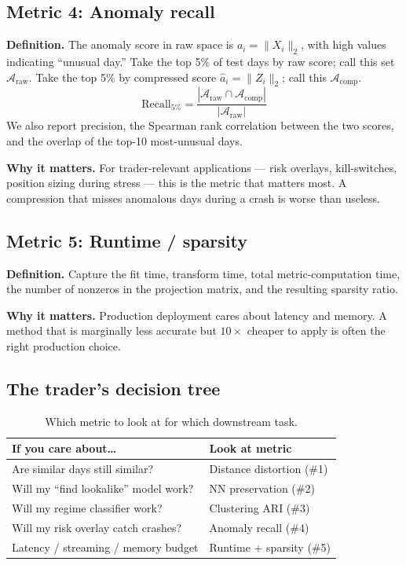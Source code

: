 \documentclass[11pt]{article}
\begin{document}
\subsection{Metric 4: Anomaly recall}

\textbf{Definition.} The anomaly score in raw space is $a_i = \|X_i\|_2$, with high values indicating ``unusual day.'' Take the top 5\% of test days by raw score; call this set $\mathcal{A}_{\mathrm{raw}}$. Take the top 5\% by compressed score $\hat a_i = \|Z_i\|_2$; call this $\mathcal{A}_{\mathrm{comp}}$.
\[
\mathrm{Recall}_{5\%} = \frac{|\mathcal{A}_{\mathrm{raw}} \cap \mathcal{A}_{\mathrm{comp}}|}{|\mathcal{A}_{\mathrm{raw}}|}
\]
We also report precision, the Spearman rank correlation between the two scores, and the overlap of the top-10 most-unusual days.

\textbf{Why it matters.} For trader-relevant applications --- risk overlays, kill-switches, position sizing during stress --- this is the metric that matters most. A compression that misses anomalous days during a crash is worse than useless.

\subsection{Metric 5: Runtime / sparsity}

\textbf{Definition.} Capture the fit time, transform time, total metric-computation time, the number of nonzeros in the projection matrix, and the resulting sparsity ratio.

\textbf{Why it matters.} Production deployment cares about latency and memory. A method that is marginally less accurate but $10\times$ cheaper to apply is often the right production choice.

\subsection{The trader's decision tree}

\begin{table}[H]
\centering
\caption{Which metric to look at for which downstream task.}
\begin{tabular}{p{6cm} p{4cm}}
\toprule
\textbf{If you care about\dots} & \textbf{Look at metric} \\
\midrule
Are similar days still similar? & Distance distortion (\#1) \\
Will my ``find lookalike'' model work? & NN preservation (\#2) \\
Will my regime classifier work? & Clustering ARI (\#3) \\
Will my risk overlay catch crashes? & Anomaly recall (\#4) \\
Latency / streaming / memory budget & Runtime + sparsity (\#5) \\
\bottomrule
\end{tabular}
\end{table}
\end{document}
